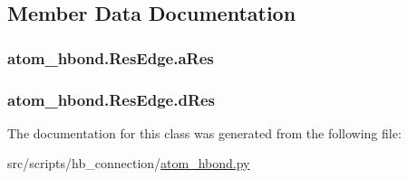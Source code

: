 \subsection{Member Data Documentation}
\hypertarget{classatom__hbond_1_1_res_edge_a6ba4a08bcf8e7c4f4f7ce68fd89502df}{
\subsubsection[{a\-Res}]{\setlength{\rightskip}{0pt plus 5cm}atom\-\_\-hbond.\-Res\-Edge.\-a\-Res}}\label{classatom__hbond_1_1_res_edge_a6ba4a08bcf8e7c4f4f7ce68fd89502df}
\hypertarget{classatom__hbond_1_1_res_edge_a5a7542d9deea5ec7f8cab053e197439e}{
\subsubsection[{d\-Res}]{\setlength{\rightskip}{0pt plus 5cm}atom\-\_\-hbond.\-Res\-Edge.\-d\-Res}}\label{classatom__hbond_1_1_res_edge_a5a7542d9deea5ec7f8cab053e197439e}


The documentation for this class was generated from the following file\-:\begin{DoxyCompactItemize}
\item 
src/scripts/hb\-\_\-connection/\hyperlink{atom__hbond_8py}{atom\-\_\-hbond.\-py}\end{DoxyCompactItemize}
